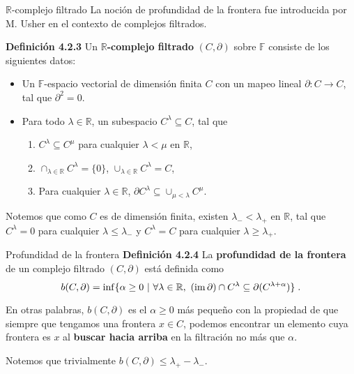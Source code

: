 \documentclass{beamer}
\newcommand{\de}{\partial}
\def\R{\mathbb{R}}
\def\F {\mathbb{F}}
\begin{document}
\begin{frame}{$\R$-complejo filtrado}
La noción de profundidad de la frontera fue introducida por M. Usher en el contexto de complejos filtrados. \\[0.3cm] \pause

\textbf{{\color{cyan}Definición 4.2.3}} Un \textbf{{\color{green}$\R$-complejo filtrado}} $(C, \de)$ sobre $\F$ consiste de los siguientes datos:  \pause
	\begin{itemize}
		\item
			Un $\F$-espacio vectorial de dimensión finita $C$ con un mapeo lineal $\de : C \to C$, tal que $\de ^2 = 0$.\\[0.2cm] \pause 
		\item Para todo $\lambda \in \R$, un subespacio $C^\lambda \subseteq C$, tal que \\[0.2cm]\pause
			\begin{enumerate}[1.]
				\item
					$C^\lambda \subseteq C^\mu$ para cualquier $\lambda < \mu$ en $\R$, \\[0.2cm]\pause
				\item
					$\cap_{\lambda \in \R} C^\lambda = \{ 0 \}$, $\cup_{\lambda \in \R} C^\lambda = C$, \\[0.2cm] \pause
				\item
					Para cualquier $\lambda \in \R$, $\de C^\lambda \subseteq \cup_{\mu < \lambda} C^\mu $.  \\[0.2cm] \pause
					
			\end{enumerate}
	\end{itemize}
Notemos que como $C$ es de dimensión finita, existen $\lambda_{-} < \lambda_{+}$ en $\R$, tal que $C^{\lambda}= 0 $ para cualquier $\lambda \leq \lambda_{-}$ y $C^\lambda = C$ para cualquier $\lambda \geq \lambda_{+}$.
\end{frame}

\begin{frame}{Profundidad de la frontera}
\textbf{{\color{cyan}Definición 4.2.4}} La \textbf{{\color{green}profundidad de la frontera}} de un complejo filtrado $(C, \de)$ está definida como
\begin{equation}
	b(C,\de) = \inf \{ \alpha \geq 0 \ |\  \forall \lambda \in \R, \ (\im \de) \cap C^\lambda \subseteq \de(C^{\lambda+\alpha}) \} \;.
	\end{equation} 
 \pause 

En otras palabras, $b (C, \de)$ es el $\alpha \geq 0$ más pequeño con la propiedad de que siempre que tengamos una frontera $x\in C$, podemos encontrar un elemento cuya frontera es $x$ al \textbf{{\color{green}buscar hacia arriba}} en la filtración no más que $\alpha$.\pause 

Notemos que trivialmente $b (C, \de) \leq \lambda_{+} - \lambda_{-}$.


\end{frame}
\end{document}

